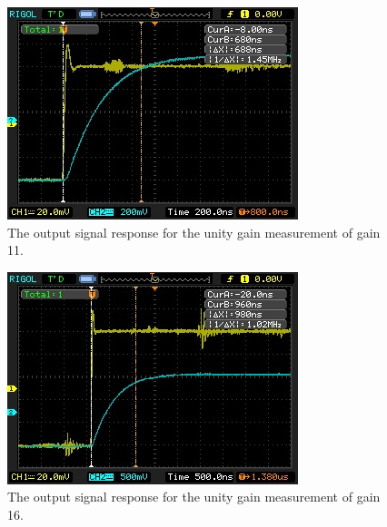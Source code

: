 \documentclass[11pt]{article}
\begin{document}
\begin{figure}[H]
 \begin{center}
  \includegraphics[width=\linewidth/2]{act1Gain11}
  \caption{The output signal response for the unity gain measurement of gain 11.}
  \label{fig:act1Gain11}
 \end{center}
\end{figure}

\begin{figure}[H]
 \begin{center}
  \includegraphics[width=\linewidth/1]{act1Gain16}
  \caption{The output signal response for the unity gain measurement of gain 16.}
  \label{fig:act1Gain16}
 \end{center}
\end{figure}
\end{document}
